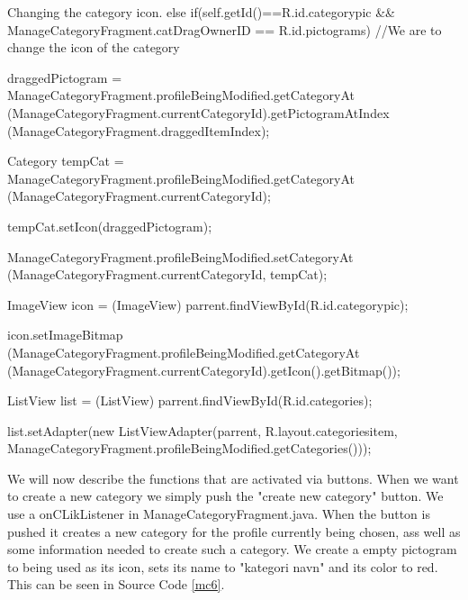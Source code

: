 \begin{source}[{mc5}]{Changing the category icon.}
else if(self.getId()==R.id.categorypic && ManageCategoryFragment.catDragOwnerID == R.id.pictograms) //We are to change the icon of the category
				{
					draggedPictogram = ManageCategoryFragment.profileBeingModified.getCategoryAt
						(ManageCategoryFragment.currentCategoryId).getPictogramAtIndex
						(ManageCategoryFragment.draggedItemIndex);
					
					Category tempCat = ManageCategoryFragment.profileBeingModified.getCategoryAt
						(ManageCategoryFragment.currentCategoryId);
					
					tempCat.setIcon(draggedPictogram);
					
					ManageCategoryFragment.profileBeingModified.setCategoryAt
						(ManageCategoryFragment.currentCategoryId, tempCat);
					
					ImageView icon = (ImageView) parrent.findViewById(R.id.categorypic);
					
					icon.setImageBitmap
						(ManageCategoryFragment.profileBeingModified.getCategoryAt
						(ManageCategoryFragment.currentCategoryId).getIcon().getBitmap());
					
					ListView list = (ListView) parrent.findViewById(R.id.categories);
					
					list.setAdapter(new ListViewAdapter(parrent, R.layout.categoriesitem,
						ManageCategoryFragment.profileBeingModified.getCategories()));
				}
\end{source}
We will now describe the functions that are activated via buttons.
When we want to create a new category we simply push the "create new category" button. 
We use a onCLikListener in ManageCategoryFragment.java. 
When the button is pushed it creates a new category for the profile currently being chosen, ass well as some information needed to create such a category. 
We create a empty pictogram to being used as its icon, sets its name to "kategori navn" and its color to red. 
This can be seen in Source Code \ref{mc6}.

